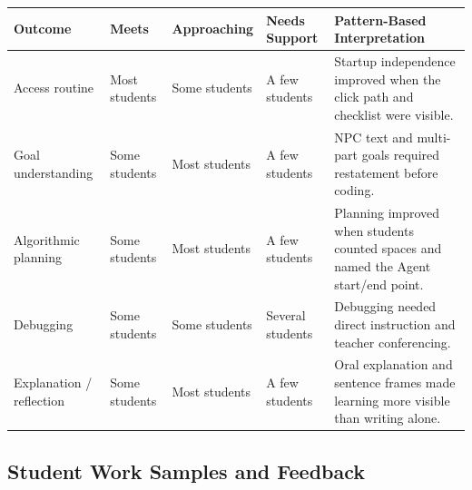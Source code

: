 \documentclass[12pt]{article}
\begin{document}
\newpage
\begin{xltabular}{\textwidth}{|P{0.8in}|P{0.8in}|P{0.8in}|P{1.0in}|P{2.5in}|}
\hline
{}\color{white}\bfseries Outcome & \color{white}\bfseries Meets & \color{white}\bfseries Approaching & \color{white}\bfseries Needs Support & \color{white}\bfseries Pattern-Based Interpretation \\
\hline
Access routine & Most students & Some students & A few students & Startup independence improved when the click path and checklist were visible. \\
\hline
{} Goal understanding & Some students & Most students & A few students & NPC text and multi-part goals required restatement before coding. \\
\hline
Algorithmic planning & Some students & Most students & A few students & Planning improved when students counted spaces and named the Agent start/end point. \\
\hline
{} Debugging & Some students & Some students & Several students & Debugging needed direct instruction and teacher conferencing. \\
\hline
Explanation / reflection & Some students & Most students & A few students & Oral explanation and sentence frames made learning more visible than writing alone. \\
\hline
\end{xltabular}

\subsection{Student Work Samples and Feedback}
\end{document}
